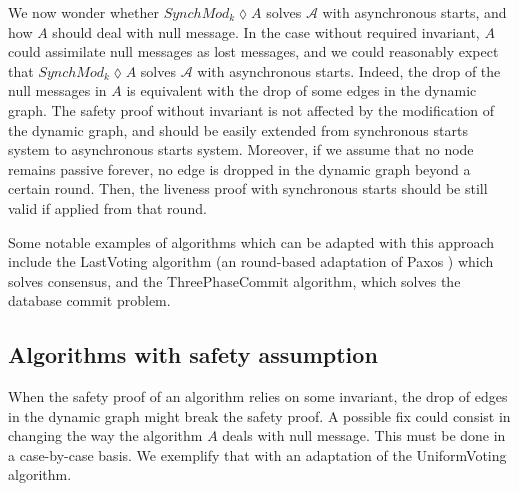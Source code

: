 \documentclass{article}
\begin{document}
We now wonder whether $SynchMod_k \lozenge A$ solves $\mathcal{A}$ with asynchronous starts, and how $A$ should deal with null message.
In the case without required invariant, $A$ could assimilate null messages as lost messages,
and we could reasonably expect that $SynchMod_k \lozenge A$ solves $\mathcal{A}$ with asynchronous starts.
Indeed, the drop of the null messages in $A$ is equivalent with the drop of some edges in the dynamic graph.
The safety proof without invariant is not affected by the modification of the dynamic graph, and should be easily extended from synchronous starts system to asynchronous starts system.
Moreover, if we assume that no node remains passive forever, no edge is dropped in the dynamic graph beyond a certain round.
Then, the liveness proof with synchronous starts should be still valid if applied from that round.

Some notable examples of algorithms which can be adapted with this approach include the LastVoting \cite{model_ho} algorithm (an round-based adaptation of Paxos \cite{paxos}) which solves consensus,
and the ThreePhaseCommit \cite{3PC} algorithm, which solves the database commit problem.

\subsection{Algorithms with safety assumption}

When the safety proof of an algorithm relies on some invariant, the drop of edges in the dynamic graph might break the safety proof.
A possible fix could consist in changing the way the algorithm $A$ deals with null message. This must be done in a case-by-case basis.
We exemplify that with an adaptation of the UniformVoting \cite{model_ho} \cite{ben_or} algorithm.
\end{document}
